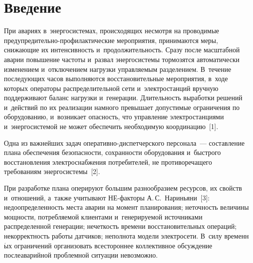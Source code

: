 
  
\vspace*{-6pt}



\thispagestyle{headings}

\begin{multicols}{2}

\label{st\stat}
  
\section{Введение}

\vspace*{-2pt}

  При авариях в~энергосистемах, происходящих несмотря на проводимые 
предупредительно-про\-фи\-лак\-ти\-че\-ские мероприятия, принимаются меры, 
снижающие их интенсивность и~продолжительность. Сразу после масштабной 
аварии повышение частоты и~развал энер\-го\-сис\-те\-мы тормозятся автоматически 
изменением и~отключением нагрузки управляемым разделением. В~течение 
по\-сле\-ду\-ющих часов выполняются восстановительные мероприятия, в~ходе 
которых операторы распределительной сети и~электростанций вручную 
поддерживают баланс нагрузки и~генерации. Длительность выработки решений 
и~действий по их реализации намного превышает допустимые ограничения по 
оборудованию, и~возникает опас\-ность, что управ\-ле\-ние электростанциями 
и~энер\-го\-сис\-те\-мой не может обеспечить необходимую координацию~[1]. 

Одна 
из важнейших задач опе\-ра\-тив\-но-дис\-пет\-чер\-ско\-го персонала~--- 
составление плана обеспечения безопасности, сохранности оборудования 
и~быст\-ро\-го восстановления электроснабжения потребителей, не 
противоречащего требованиям энер\-го\-сис\-те\-мы~[2]. 
  
  При разработке плана оперируют большим разнообразием ресурсов, их 
свойств и~отношений, а~так\-же учитывают НЕ-фак\-то\-ры 
А.\,С.~Нариньяни~[3]: недоопределенность места аварии на момент 
планирования; не\-точ\-ность величины мощ\-ности, по\-треб\-ля\-емой клиентами 
и~генерируемой источниками распределенной генерации; не\-чет\-кость времени 
восстановительных операций; не\-кор\-рект\-ность работы датчиков; неполнота 
модели электросети. В~силу временн$\acute{\mbox{ы}}$х ограничений организовать 
всестороннее коллективное обсуж\-де\-ние послеаварийной проб\-лем\-ной ситуации 
не\-воз\-можно. 


\end{multicols}
